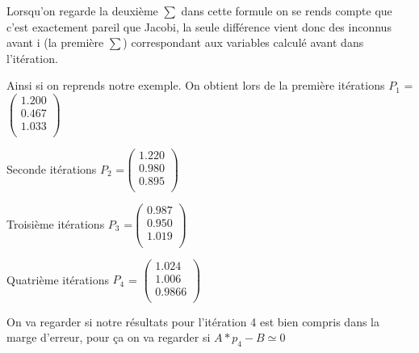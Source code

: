 \documentclass[12pt]{article}
\begin{document}
  Lorsqu'on regarde la deuxième $\sum$ dans cette formule on se rends compte que c'est exactement pareil que Jacobi, la seule différence vient donc des inconnus avant i (la première $\sum$) correspondant aux variables calculé avant dans l'itération.

  Ainsi si on reprends notre exemple. On obtient lors de la première itérations $P_1$ =$
  \begin{pmatrix}
 
    1.200 \\

    0.467 \\

    1.033 \\

  \end{pmatrix}$

  Seconde itérations $P_2$ =$
  \begin{pmatrix}
 
    1.220 \\

    0.980 \\

    0.895 \\

  \end{pmatrix}$

  
   Troisième itérations $P_3$ =$
  \begin{pmatrix}
 
    0.987 \\

    0.950 \\

    1.019 \\

  \end{pmatrix}$

  
  Quatrième itérations $P_4$ = $
  \begin{pmatrix}
 
    1.024 \\

    1.006 \\

    0.9866 \\

  \end{pmatrix}
  $
\vspace{0.2cm}

On va regarder si notre résultats pour l'itération 4 est bien compris dans la marge d'erreur, pour ça on va regarder si $A*p_4 - B \simeq 0$
\end{document}
